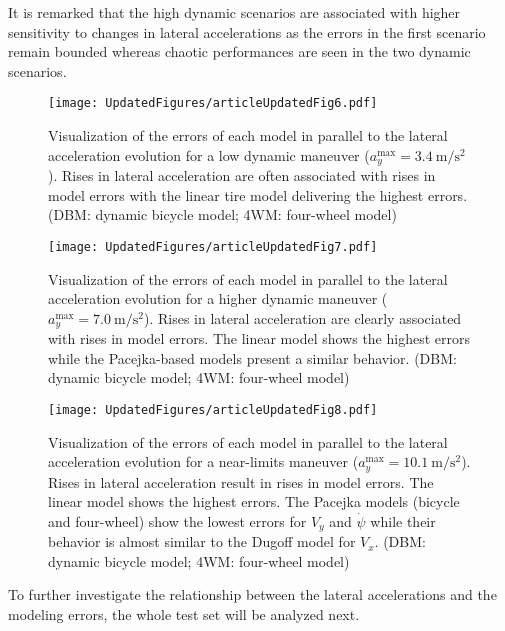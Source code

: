 \documentclass[journal]{IEEEtran}
\begin{document}
It is remarked that the high dynamic scenarios are associated with higher sensitivity to changes in lateral accelerations as the errors in the first scenario remain bounded whereas chaotic performances are seen in the two dynamic scenarios.

\begin{figure}[h]
    \centering
    \texttt{[image: UpdatedFigures/articleUpdatedFig6.pdf]}
    \caption{Visualization of the errors of each model in parallel to the lateral acceleration evolution for a low dynamic maneuver ($a_y^{\text{max}} = \SI{3.4}{\meter\per\second\squared}$). Rises in lateral acceleration are often associated with rises in model errors with the linear tire model delivering the highest errors. (DBM: dynamic bicycle model; 4WM: four-wheel model)}
    \label{lowD-vis.fig}
\end{figure}

\begin{figure}[h]
    \centering
    \texttt{[image: UpdatedFigures/articleUpdatedFig7.pdf]}
    \caption{Visualization of the errors of each model in parallel to the lateral acceleration evolution for a higher dynamic maneuver ($a_y^{\text{max}} = \SI{7.0}{\meter\per\second\squared}$). Rises in lateral acceleration are clearly associated with rises in model errors. The linear model shows the highest errors while the Pacejka-based models present a similar behavior. (DBM: dynamic bicycle model; 4WM: four-wheel model)}
    \label{medD-vis.fig}
\end{figure}

\begin{figure}[h]
    \centering
    \texttt{[image: UpdatedFigures/articleUpdatedFig8.pdf]}
    \caption{Visualization of the errors of each model in parallel to the lateral acceleration evolution for a near-limits maneuver ($a_y^{\text{max}} = \SI{10.1}{\meter\per\second\squared}$). Rises in lateral acceleration result in rises in model errors. The linear model shows the highest errors. The Pacejka models (bicycle and four-wheel) show the lowest errors for $V_y$ and $\dot\psi$ while their behavior is almost similar to the Dugoff model for $V_x$. (DBM: dynamic bicycle model; 4WM: four-wheel model)}
    \label{highD-vis.fig}
\end{figure}

To further investigate the relationship between the lateral accelerations and the modeling errors, the whole test set will be analyzed next.
\end{document}

